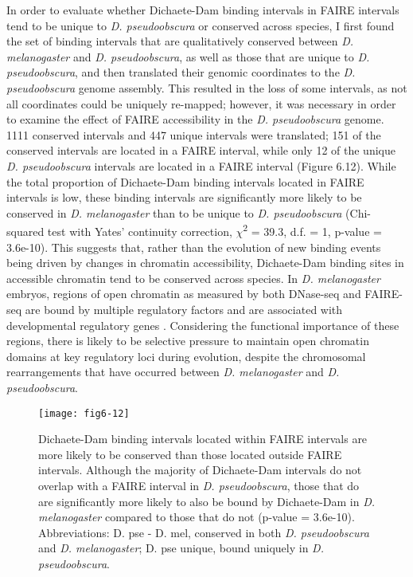In order to evaluate whether Dichaete-Dam binding intervals in FAIRE intervals tend to be unique to \emph{D. pseudoobscura} or conserved across species, I first found the set of binding intervals that are qualitatively conserved between \emph{D. melanogaster} and \emph{D. pseudoobscura}, as well as those that are unique to \emph{D. pseudoobscura}, and then translated their genomic coordinates to the \emph{D. pseudoobscura} genome assembly. This resulted in the loss of some intervals, as not all coordinates could be uniquely re-mapped; however, it was necessary in order to examine the effect of FAIRE accessibility in the \emph{D. pseudoobscura} genome. 1111 conserved intervals and 447 unique intervals were translated; 151 of the conserved intervals are located in a FAIRE interval, while only 12 of the unique \emph{D. pseudoobscura} intervals are located in a FAIRE interval (Figure 6.12). While the total proportion of Dichaete-Dam binding intervals located in FAIRE intervals is low, these binding intervals are significantly more likely to be conserved in \emph{D. melanogaster} than to be unique to \emph{D. pseudoobscura} (Chi-squared test with Yates’ continuity correction, \(\chi\)\textsuperscript{2} = 39.3, d.f. = 1, p-value = 3.6e-10). This suggests that, rather than the evolution of new binding events being driven by changes in chromatin accessibility, Dichaete-Dam binding sites in accessible chromatin tend to be conserved across species. In \emph{D. melanogaster} embryos, regions of open chromatin as measured by both DNase-seq and FAIRE-seq are bound by multiple regulatory factors and are associated with developmental regulatory genes \citep{mckay_common_2013,thomas_dynamic_2011}. Considering the functional importance of these regions, there is likely to be selective pressure to maintain open chromatin domains at key regulatory loci during evolution, despite the chromosomal rearrangements that have occurred between \emph{D. melanogaster} and \emph{D. pseudoobscura}.

\begin{figure}
\centering
\texttt{[image: fig6-12]}
\caption{Dichaete-Dam binding intervals located within FAIRE intervals are more likely to be conserved than those located outside FAIRE intervals. Although the majority of Dichaete-Dam intervals do not overlap with a FAIRE interval in \emph{D. pseudoobscura}, those that do are significantly more likely to also be bound by Dichaete-Dam in \emph{D. melanogaster} compared to those that do not (p-value = 3.6e-10). Abbreviations: D. pse - D. mel, conserved in both \emph{D. pseudoobscura} and \emph{D. melanogaster}; D. pse unique, bound uniquely in \emph{D. pseudoobscura}.}
\label{Figure 6.12}
\end{figure}

